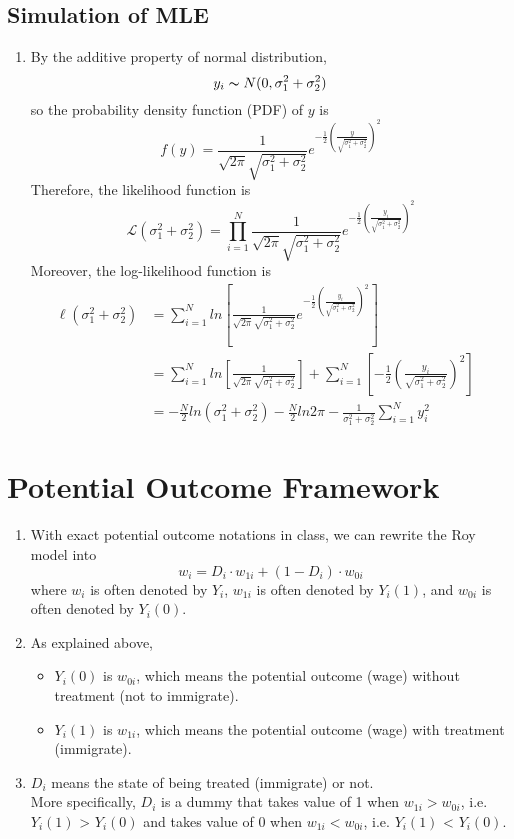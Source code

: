 \documentclass[12pt]{article}
\begin{document}
\subsection{Simulation of MLE} \label{MLE}
\begin{enumerate}
      \item By the additive property of normal distribution, $$y_i\thicksim N(0, \sigma^2_1 + \sigma^2_2)$$
            so the probability density function (PDF) of $y$ is $$f(y) = \frac{1}{\sqrt{2 \pi} \sqrt{\sigma^2_1 + \sigma^2_2}} e^{- \frac{1}{2} (\frac{y}{\sqrt{\sigma^2_1 + \sigma^2_2}})^2}$$
            Therefore, the likelihood function is $$\mathcal{L}(\sigma^2_1 + \sigma^2_2) = \prod_{i = 1}^{N} \frac{1}{\sqrt{2 \pi} \sqrt{\sigma^2_1 + \sigma^2_2}} e^{- \frac{1}{2} (\frac{y_i}{\sqrt{\sigma^2_1 + \sigma^2_2}})^2}$$
            Moreover, the log-likelihood function is 
            \begin{align}
            \boldsymbol \ell(\sigma^2_1 + \sigma^2_2) & = \sum_{i = 1}^{N} ln[\frac{1}{\sqrt{2 \pi} \sqrt{\sigma^2_1 + \sigma^2_2}} e^{- \frac{1}{2} (\frac{y_i}{\sqrt{\sigma^2_1 + \sigma^2_2}})^2}] & \nonumber \\ 
                                                      & = \sum_{i = 1}^{N} ln[\frac{1}{\sqrt{2 \pi} \sqrt{\sigma^2_1 + \sigma^2_2}}] + \sum_{i = 1}^{N} [- \frac{1}{2} (\frac{y_i}{\sqrt{\sigma^2_1 + \sigma^2_2}})^2] & \nonumber \\ 
                                                      & = -\frac{N}{2} ln(\sigma^2_1 + \sigma^2_2) -\frac{N}{2} ln2\pi - \frac{1}{\sigma^2_1 + \sigma^2_2} \sum_{i = 1}^{N}y_i^2 & \nonumber
            \end{align}
\end{enumerate}

\section{Potential Outcome Framework} \label{POF}
\begin{enumerate}
      \item With exact potential outcome notations in class, we can rewrite the Roy model into 
            $$w_i = D_i \cdot w_{1i} + (1 - D_i) \cdot w_{0i}$$
            where $w_i$ is often denoted by $Y_i$, $w_{1i}$ is often denoted by $Y_i(1)$, and $w_{0i}$ is often denoted by $Y_i(0)$.
      \item As explained above, 
      \begin{itemize}
            \item $Y_i(0)$ is $w_{0i}$, which means the potential outcome (wage) without treatment (not to immigrate).
            \item $Y_i(1)$ is $w_{1i}$, which means the potential outcome (wage) with treatment (immigrate).
      \end{itemize}
      \item $D_i$ means the state of being treated (immigrate) or not. \\ 
            More specifically, $D_i$ is a dummy that takes value of 1 when $w_{1i} > w_{0i}$, i.e. $Y_i(1)$ > $Y_i(0)$ 
            and takes value of 0 when $w_{1i} < w_{0i}$, i.e. $Y_i(1)$ < $Y_i(0)$.
\end{enumerate}
\end{document}
